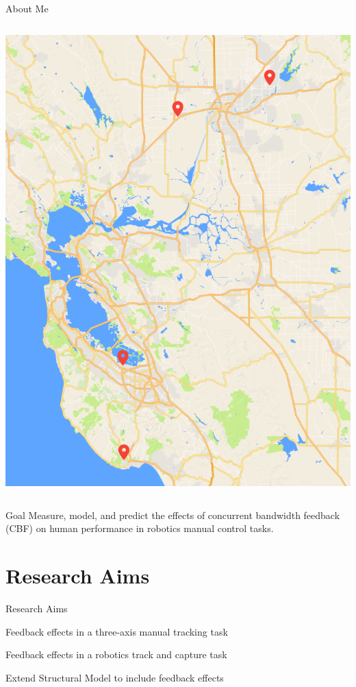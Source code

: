 \documentclass[10pt]{beamer}
\begin{document}
\begin{frame}[fragile]{About Me}
\begin{columns}[T]
\begin{column}{.4\textwidth}
      \includegraphics[width=\textwidth]{../img/california.png}
    \end{column}
  \end{columns}
\end{frame}

\begin{frame}[fragile]{Goal}
  Measure, model, and predict the effects of concurrent bandwidth feedback (CBF) on human performance in robotics manual control tasks.
\end{frame}

\section{Research Aims}

\begin{frame}[fragile]{Research Aims}
  \begin{description}[align=right]
    \item [Aim One] Feedback effects in a three-axis manual tracking task
    \item [Aim Two] Feedback effects in a robotics track and capture task
    \item [Aim Three] Extend Structural Model to include feedback effects
  \end{description}
\end{frame}
\end{document}
